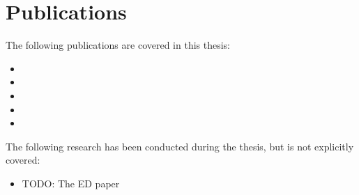 \cleardoublepage
\chapter*{Publications}

The following publications are covered in this thesis:
\begin{itemize}
\item {}
\item {}
\item {}
\item {}
\item {}
\end{itemize}

The following research has been conducted during the thesis, but is not explicitly covered:
\begin{itemize}
\item TODO: The ED paper
\end{itemize}
